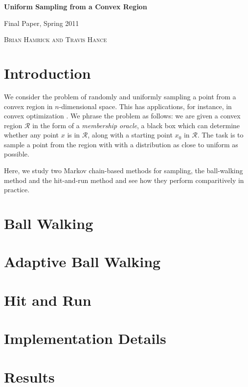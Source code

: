 \documentclass[11pt]{article}
\begin{document}
\begin{center} \begin{LARGE} {\sc \bf Uniform Sampling from a Convex Region} \vspace{6pt}

{ Final Paper, Spring 2011} \vspace{9pt}

\end{LARGE} { \Large \textsc{Brian Hamrick and Travis Hance}}

\end{center}

\section{Introduction}

We consider the problem of randomly and uniformly sampling a point from a convex region in $n$-dimensional space. This has applications, for instance, in convex optimization \cite{Dabbene}. We phrase the problem as follows: we are given a convex region $\mathcal{R}$ in the form of a \emph{membership oracle}, a black box which can determine whether any point $x$ is in $\mathcal{R}$, along with a starting point $x_0$ in $\mathcal{R}$. The task is to sample a point from the region with with a distribution as close to uniform as possible.

Here, we study two Markov chain-based methods for sampling, the ball-walking method and the hit-and-run method and see how they perform comparitively in practice.

\section{Ball Walking}

\section{Adaptive Ball Walking}

\section{Hit and Run}

\section{Implementation Details}

\section{Results}
\end{document}
